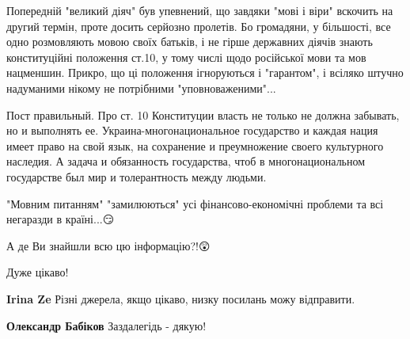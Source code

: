 \begin{itemize}
Попередній "великий діяч" був упевнений, що завдяки "мові і віри" вскочить на
другий термін, проте досить серйозно пролетів. Бо громадяни, у більшості, все
одно розмовляють мовою своїх батьків, і не гірше державних діячів знають
конституційні положення ст.10, у тому числі щодо російської мови та мов
нацменшин. Прикро, що ці положення ігноруються і "гарантом", і всіляко штучно
надуманими нікому не потрібними "уповноваженими"...

 
Пост правильный. Про ст. 10 Конституции власть не только не должна забывать, но
и выполнять ее. Украина-многонациональное государство и каждая нация имеет
право на свой язык, на сохранение и преумножение своего культурного наследия. А
задача и обязанность государства, чтоб в многонациональном государстве был мир
и толерантность между людьми.


"Мовним питанням" "замилюються" усі фінансово-економічні проблеми та всі
негаразди в країні...😏

А де Ви знайшли всю цю інформацію?!😲🧐

Дуже цікаво!🤔\Smiley[1.0][yellow]

\begin{itemize}
 
\textbf{Irina Ze} Різні джерела, якщо цікаво, низку посилань можу відправити.

 
\textbf{Олександр Бабіков}
Заздалегідь - дякую!

 

\end{itemize}
\end{itemize}
